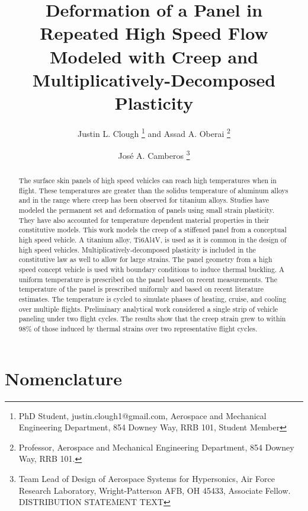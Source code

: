 \documentclass[conf]{new-aiaa}
\title{ Deformation of a Panel in Repeated High Speed Flow 
        Modeled with Creep and Multiplicatively-Decomposed Plasticity}
\author{Justin L. Clough%
        \footnote{
          PhD Student, 
          justin.clough1@gmail.com,
          Aerospace and Mechanical Engineering Department, 
          854 Downey Way, RRB 101,
          Student Member}
        and Assad A. Oberai%
        \footnote{  
          Professor, 
          Aerospace and Mechanical Engineering Department, 
          854 Downey Way, RRB 101.}}
\affil{University of Southern California,
       Los Angeles, CA, 90089}
\author{Jos\'e A. Camberos%
        \footnote{
          Team Lead of Design of Aerospace Systems for Hypersonics, 
          Air Force Research Laboratory,
          Wright-Patterson AFB, OH 45433,
          Associate Fellow.
          \newline
          \newline
          DISTRIBUTION STATEMENT TEXT}}
\affil{Air Force Research Laboratory, Wright-Patterson AFB,
       Dayton, OH, 45433}
\begin{document}
\maketitle

\begin{abstract}
The surface skin panels of high speed vehicles can reach high 
temperatures when in flight. 
These temperatures are greater than the solidus temperature
of aluminum alloys and in the range where
creep has been observed for titanium alloys.
Studies have modeled the permanent set and deformation 
of panels using small strain plasticity.
They have also accounted for temperature
dependent material properties in their constitutive models.
This work models the creep of a stiffened panel
from a conceptual high speed vehicle.
A titanium alloy, Ti6Al4V,
is used as it is common in the design of high speed vehicles.
Multiplicatively-decomposed plasticity 
is included in the constitutive law as well to allow for large strains.
The panel geometry from a high speed concept vehicle is
used with boundary conditions to induce thermal buckling.
A uniform temperature is prescribed on the panel
based on recent measurements.
The temperature of the panel is prescribed uniformly 
and based on recent literature estimates.
The temperature is cycled to simulate phases of
heating, cruise, and cooling over multiple flights.
Preliminary analytical work considered a single strip
of vehicle paneling under two flight cycles.
The results show that the creep strain
grew to within 98\% of those induced by thermal strains 
over two representative flight cycles.
\end{abstract}

\section{Nomenclature}
\end{document}
